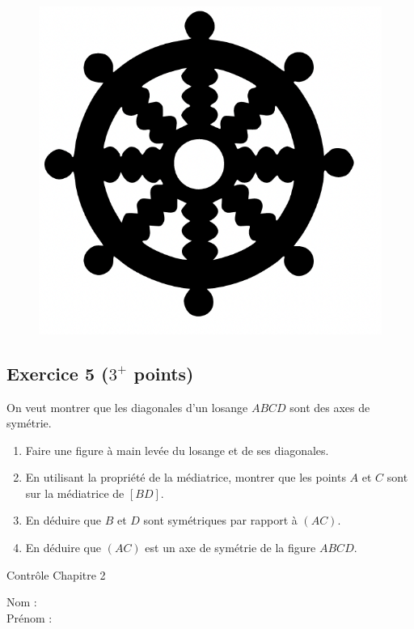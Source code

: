 \documentclass[14 pt]{extarticle}
\theoremstyle{plain}
\begin{document}
\begin{figure}[H]
\includegraphics[scale=.4]{Symb2.png}
\end{figure}
 
 \subsection*{Exercice 5 ($3^+$ points)}
 
On veut montrer que les diagonales d'un losange $ABCD$ sont des axes de symétrie. 

\begin{enumerate}
\item Faire une figure à main levée du losange et de ses diagonales. 
\item En utilisant la propriété de la médiatrice, montrer que les points $A$ et $C$ sont sur la médiatrice de $[BD]$. 
\item En déduire que $B$ et $D$ sont symétriques par rapport à $(AC)$. 
\item En déduire que $(AC)$ est un axe de symétrie de la figure $ABCD$. 
\end{enumerate}


\newpage 

\begin{center}{\Large Contrôle Chapitre 2}\\ 
 \end{center}
 Nom : \\
 Prénom : \\
 
\end{document}
